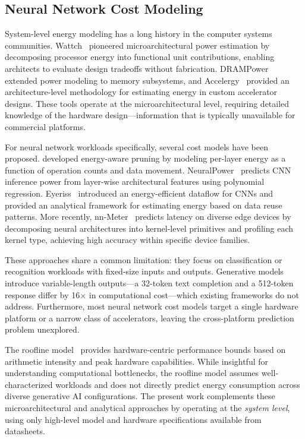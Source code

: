 \documentclass[review,12pt,authoryear]{elsarticle}
\begin{document}
\subsection{Neural Network Cost Modeling}
\label{sec:rw_cost_modeling}

System-level energy modeling has a long history in the computer systems communities.
Wattch~\citep{brooks2000wattch} pioneered microarchitectural power estimation by decomposing processor energy into functional unit contributions, enabling architects to evaluate design tradeoffs without fabrication.
DRAMPower~\citep{chandrasekar2012drampower} extended power modeling to memory subsystems, and Accelergy~\citep{wu2019machine} provided an architecture-level methodology for estimating energy in custom accelerator designs.
These tools operate at the microarchitectural level, requiring detailed knowledge of the hardware design---information that is typically unavailable for commercial platforms.

For neural network workloads specifically, several cost models have been proposed.
\citet{yang2017designing} developed energy-aware pruning by modeling per-layer energy as a function of operation counts and data movement.
NeuralPower~\citep{cai2017neuralpower} predicts CNN inference power from layer-wise architectural features using polynomial regression.
Eyeriss~\citep{chen2016eyeriss} introduced an energy-efficient dataflow for CNNs and provided an analytical framework for estimating energy based on data reuse patterns.
More recently, nn-Meter~\citep{zhang2021nnmeter} predicts latency on diverse edge devices by decomposing neural architectures into kernel-level primitives and profiling each kernel type, achieving high accuracy within specific device families.

These approaches share a common limitation: they focus on classification or recognition workloads with fixed-size inputs and outputs.
Generative models introduce variable-length outputs---a 32-token text completion and a 512-token response differ by 16$\times$ in computational cost---which existing frameworks do not address.
Furthermore, most neural network cost models target a single hardware platform or a narrow class of accelerators, leaving the cross-platform prediction problem unexplored.

The roofline model~\citep{williams2009roofline} provides hardware-centric performance bounds based on arithmetic intensity and peak hardware capabilities.
While insightful for understanding computational bottlenecks, the roofline model assumes well-characterized workloads and does not directly predict energy consumption across diverse generative AI configurations.
The present work complements these microarchitectural and analytical approaches by operating at the \emph{system level}, using only high-level model and hardware specifications available from datasheets.
\end{document}
